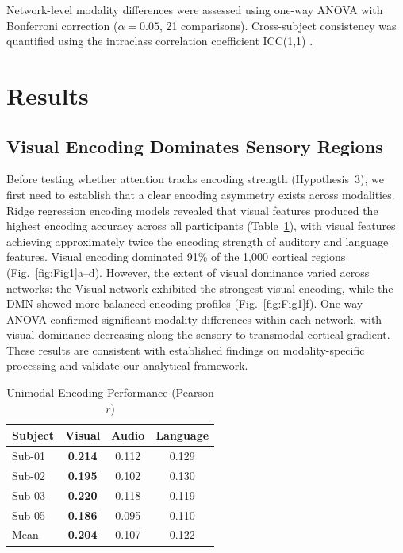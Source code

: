 \documentclass[conference]{IEEEtran}
\begin{document}
Network-level modality differences were assessed using one-way ANOVA with Bonferroni correction ($\alpha = 0.05$, 21 comparisons). Cross-subject consistency was quantified using the intraclass correlation coefficient ICC(1,1) \cite{shrout1979intraclass}.

\section{Results}

\subsection{Visual Encoding Dominates Sensory Regions}

Before testing whether attention tracks encoding strength (Hypothesis~3), we first need to establish that a clear encoding asymmetry exists across modalities. Ridge regression encoding models revealed that visual features produced the highest encoding accuracy across all participants (Table~\ref{tab:encoding}), with visual features achieving approximately twice the encoding strength of auditory and language features. Visual encoding dominated 91\% of the 1,000 cortical regions (Fig.~\ref{fig:Fig1}a--d). However, the extent of visual dominance varied across networks: the Visual network exhibited the strongest visual encoding, while the DMN showed more balanced encoding profiles (Fig.~\ref{fig:Fig1}f). One-way ANOVA confirmed significant modality differences within each network, with visual dominance decreasing along the sensory-to-transmodal cortical gradient. These results are consistent with established findings on modality-specific processing \cite{gucclu2015deep} and validate our analytical framework.

\begin{table}[t]
\caption{Unimodal Encoding Performance (Pearson $r$)}
\label{tab:encoding}
\centering
\setlength{\tabcolsep}{8pt}
\begin{tabular}{lccc}
\toprule
Subject & Visual & Audio & Language \\
\midrule
Sub-01 & \textbf{0.214} & 0.112 & 0.129 \\
Sub-02 & \textbf{0.195} & 0.102 & 0.130 \\
Sub-03 & \textbf{0.220} & 0.118 & 0.119 \\
Sub-05 & \textbf{0.186} & 0.095 & 0.110 \\
\midrule
Mean & \textbf{0.204} & 0.107 & 0.122 \\
\bottomrule
\end{tabular}
\end{table}
\end{document}
